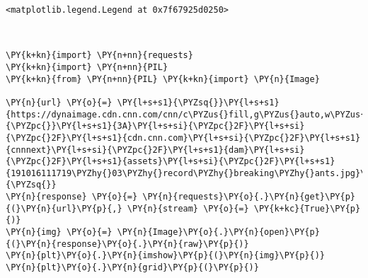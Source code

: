             \begin{tcolorbox}[breakable, size=fbox, boxrule=.5pt, pad at break*=1mm, opacityfill=0]
\begin{Verbatim}[commandchars=\\\{\}]
<matplotlib.legend.Legend at 0x7f67925d0250>
\end{Verbatim}
\end{tcolorbox}
        
    \begin{center}
    \end{center}
    { \hspace*{\fill} \\}
    
    \begin{tcolorbox}[breakable, size=fbox, boxrule=1pt, pad at break*=1mm,colback=cellbackground, colframe=cellborder]
\begin{Verbatim}[commandchars=\\\{\}]
\PY{k+kn}{import} \PY{n+nn}{requests}
\PY{k+kn}{import} \PY{n+nn}{PIL}
\PY{k+kn}{from} \PY{n+nn}{PIL} \PY{k+kn}{import} \PY{n}{Image}

\PY{n}{url} \PY{o}{=} \PY{l+s+s1}{\PYZsq{}}\PY{l+s+s1}{https://dynaimage.cdn.cnn.com/cnn/c\PYZus{}fill,g\PYZus{}auto,w\PYZus{}1200,h\PYZus{}675,ar\PYZus{}16:9/https}\PY{l+s+s1}{\PYZpc{}}\PY{l+s+s1}{3A}\PY{l+s+si}{\PYZpc{}2F}\PY{l+s+si}{\PYZpc{}2F}\PY{l+s+s1}{cdn.cnn.com}\PY{l+s+si}{\PYZpc{}2F}\PY{l+s+s1}{cnnnext}\PY{l+s+si}{\PYZpc{}2F}\PY{l+s+s1}{dam}\PY{l+s+si}{\PYZpc{}2F}\PY{l+s+s1}{assets}\PY{l+s+si}{\PYZpc{}2F}\PY{l+s+s1}{191016111719\PYZhy{}03\PYZhy{}record\PYZhy{}breaking\PYZhy{}ants.jpg}\PY{l+s+s1}{\PYZsq{}}
\PY{n}{response} \PY{o}{=} \PY{n}{requests}\PY{o}{.}\PY{n}{get}\PY{p}{(}\PY{n}{url}\PY{p}{,} \PY{n}{stream} \PY{o}{=} \PY{k+kc}{True}\PY{p}{)}
\PY{n}{img} \PY{o}{=} \PY{n}{Image}\PY{o}{.}\PY{n}{open}\PY{p}{(}\PY{n}{response}\PY{o}{.}\PY{n}{raw}\PY{p}{)}
\PY{n}{plt}\PY{o}{.}\PY{n}{imshow}\PY{p}{(}\PY{n}{img}\PY{p}{)}
\PY{n}{plt}\PY{o}{.}\PY{n}{grid}\PY{p}{(}\PY{p}{)}
\end{Verbatim}
\end{tcolorbox}

    \begin{center}
    \end{center}
    { \hspace*{\fill} \\}
    
